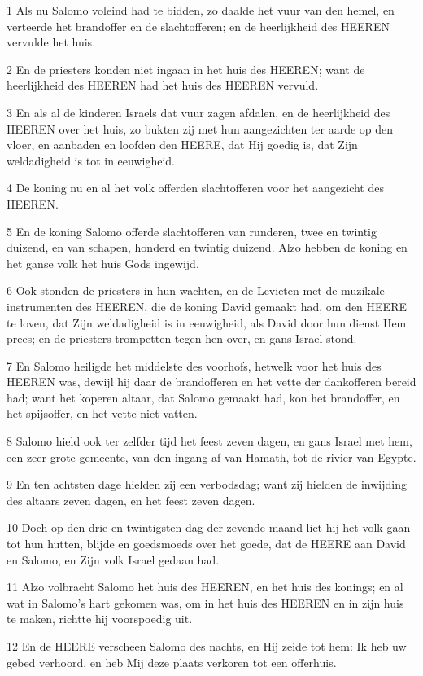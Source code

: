 \par 1 Als nu Salomo voleind had te bidden, zo daalde het vuur van den hemel, en verteerde het brandoffer en de slachtofferen; en de heerlijkheid des HEEREN vervulde het huis.
\par 2 En de priesters konden niet ingaan in het huis des HEEREN; want de heerlijkheid des HEEREN had het huis des HEEREN vervuld.
\par 3 En als al de kinderen Israels dat vuur zagen afdalen, en de heerlijkheid des HEEREN over het huis, zo bukten zij met hun aangezichten ter aarde op den vloer, en aanbaden en loofden den HEERE, dat Hij goedig is, dat Zijn weldadigheid is tot in eeuwigheid.
\par 4 De koning nu en al het volk offerden slachtofferen voor het aangezicht des HEEREN.
\par 5 En de koning Salomo offerde slachtofferen van runderen, twee en twintig duizend, en van schapen, honderd en twintig duizend. Alzo hebben de koning en het ganse volk het huis Gods ingewijd.
\par 6 Ook stonden de priesters in hun wachten, en de Levieten met de muzikale instrumenten des HEEREN, die de koning David gemaakt had, om den HEERE te loven, dat Zijn weldadigheid is in eeuwigheid, als David door hun dienst Hem prees; en de priesters trompetten tegen hen over, en gans Israel stond.
\par 7 En Salomo heiligde het middelste des voorhofs, hetwelk voor het huis des HEEREN was, dewijl hij daar de brandofferen en het vette der dankofferen bereid had; want het koperen altaar, dat Salomo gemaakt had, kon het brandoffer, en het spijsoffer, en het vette niet vatten.
\par 8 Salomo hield ook ter zelfder tijd het feest zeven dagen, en gans Israel met hem, een zeer grote gemeente, van den ingang af van Hamath, tot de rivier van Egypte.
\par 9 En ten achtsten dage hielden zij een verbodsdag; want zij hielden de inwijding des altaars zeven dagen, en het feest zeven dagen.
\par 10 Doch op den drie en twintigsten dag der zevende maand liet hij het volk gaan tot hun hutten, blijde en goedsmoeds over het goede, dat de HEERE aan David en Salomo, en Zijn volk Israel gedaan had.
\par 11 Alzo volbracht Salomo het huis des HEEREN, en het huis des konings; en al wat in Salomo's hart gekomen was, om in het huis des HEEREN en in zijn huis te maken, richtte hij voorspoedig uit.
\par 12 En de HEERE verscheen Salomo des nachts, en Hij zeide tot hem: Ik heb uw gebed verhoord, en heb Mij deze plaats verkoren tot een offerhuis.
